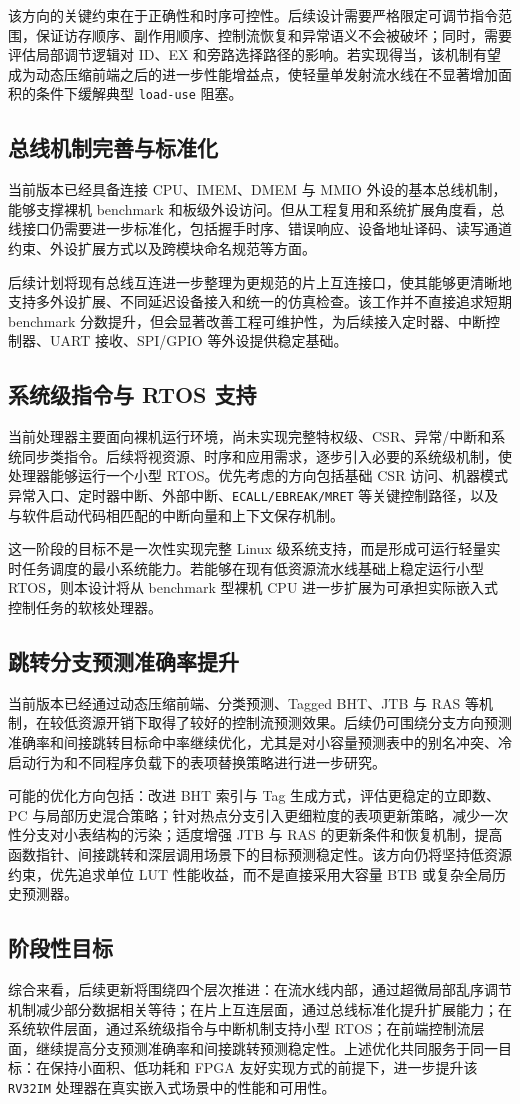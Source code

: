 ﻿\documentclass[12pt,a4paper]{ctexart}
\begin{document}
该方向的关键约束在于正确性和时序可控性。后续设计需要严格限定可调节指令范围，保证访存顺序、副作用顺序、控制流恢复和异常语义不会被破坏；同时，需要评估局部调节逻辑对 ID、EX 和旁路选择路径的影响。若实现得当，该机制有望成为动态压缩前端之后的进一步性能增益点，使轻量单发射流水线在不显著增加面积的条件下缓解典型 \texttt{load-use} 阻塞。

\subsection{总线机制完善与标准化}
当前版本已经具备连接 CPU、IMEM、DMEM 与 MMIO 外设的基本总线机制，能够支撑裸机 benchmark 和板级外设访问。但从工程复用和系统扩展角度看，总线接口仍需要进一步标准化，包括握手时序、错误响应、设备地址译码、读写通道约束、外设扩展方式以及跨模块命名规范等方面。

后续计划将现有总线互连进一步整理为更规范的片上互连接口，使其能够更清晰地支持多外设扩展、不同延迟设备接入和统一的仿真检查。该工作并不直接追求短期 benchmark 分数提升，但会显著改善工程可维护性，为后续接入定时器、中断控制器、UART 接收、SPI/GPIO 等外设提供稳定基础。

\subsection{系统级指令与 RTOS 支持}
当前处理器主要面向裸机运行环境，尚未实现完整特权级、CSR、异常/中断和系统同步类指令。后续将视资源、时序和应用需求，逐步引入必要的系统级机制，使处理器能够运行一个小型 RTOS。优先考虑的方向包括基础 CSR 访问、机器模式异常入口、定时器中断、外部中断、\texttt{ECALL/EBREAK/MRET} 等关键控制路径，以及与软件启动代码相匹配的中断向量和上下文保存机制。

这一阶段的目标不是一次性实现完整 Linux 级系统支持，而是形成可运行轻量实时任务调度的最小系统能力。若能够在现有低资源流水线基础上稳定运行小型 RTOS，则本设计将从 benchmark 型裸机 CPU 进一步扩展为可承担实际嵌入式控制任务的软核处理器。

\subsection{跳转分支预测准确率提升}
当前版本已经通过动态压缩前端、分类预测、Tagged BHT、JTB 与 RAS 等机制，在较低资源开销下取得了较好的控制流预测效果。后续仍可围绕分支方向预测准确率和间接跳转目标命中率继续优化，尤其是对小容量预测表中的别名冲突、冷启动行为和不同程序负载下的表项替换策略进行进一步研究。

可能的优化方向包括：改进 BHT 索引与 Tag 生成方式，评估更稳定的立即数、PC 与局部历史混合策略；针对热点分支引入更细粒度的表项更新策略，减少一次性分支对小表结构的污染；适度增强 JTB 与 RAS 的更新条件和恢复机制，提高函数指针、间接跳转和深层调用场景下的目标预测稳定性。该方向仍将坚持低资源约束，优先追求单位 LUT 性能收益，而不是直接采用大容量 BTB 或复杂全局历史预测器。

\subsection{阶段性目标}
综合来看，后续更新将围绕四个层次推进：在流水线内部，通过超微局部乱序调节机制减少部分数据相关等待；在片上互连层面，通过总线标准化提升扩展能力；在系统软件层面，通过系统级指令与中断机制支持小型 RTOS；在前端控制流层面，继续提高分支预测准确率和间接跳转预测稳定性。上述优化共同服务于同一目标：在保持小面积、低功耗和 FPGA 友好实现方式的前提下，进一步提升该 \texttt{RV32IM} 处理器在真实嵌入式场景中的性能和可用性。
\end{document}

